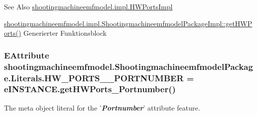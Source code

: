 \begin{DoxySeeAlso}{See Also}
\hyperlink{classshootingmachineemfmodel_1_1impl_1_1_h_w_ports_impl}{shootingmachineemfmodel.\-impl.\-H\-W\-Ports\-Impl} 

\hyperlink{classshootingmachineemfmodel_1_1impl_1_1_shootingmachineemfmodel_package_impl_a0e445554ec7e12a0acab69b315098594}{shootingmachineemfmodel.\-impl.\-Shootingmachineemfmodel\-Package\-Impl\-::get\-H\-W\-Ports()} Generierter Funktionsblock 
\end{DoxySeeAlso}
\hypertarget{interfaceshootingmachineemfmodel_1_1_shootingmachineemfmodel_package_1_1_literals_a955807dd50799b8ae1cef72c95a2b854}{
\subsubsection[{H\-W\-\_\-\-P\-O\-R\-T\-S\-\_\-\-\_\-\-P\-O\-R\-T\-N\-U\-M\-B\-E\-R}]{\setlength{\rightskip}{0pt plus 5cm}E\-Attribute shootingmachineemfmodel.\-Shootingmachineemfmodel\-Package.\-Literals.\-H\-W\-\_\-\-P\-O\-R\-T\-S\-\_\-\-\_\-\-P\-O\-R\-T\-N\-U\-M\-B\-E\-R = e\-I\-N\-S\-T\-A\-N\-C\-E.\-get\-H\-W\-Ports\-\_\-\-Portnumber()}}\label{interfaceshootingmachineemfmodel_1_1_shootingmachineemfmodel_package_1_1_literals_a955807dd50799b8ae1cef72c95a2b854}
The meta object literal for the '{\itshape {\bfseries Portnumber}}' attribute feature.

